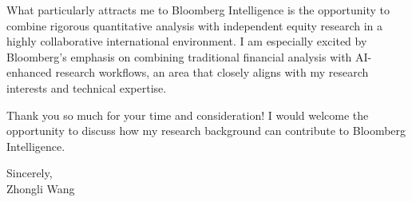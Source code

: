 \documentclass[11pt]{article}
\begin{document}
What particularly attracts me to Bloomberg Intelligence is the opportunity to combine rigorous quantitative analysis with independent equity research in a highly collaborative international environment. I am especially excited by Bloomberg's emphasis on combining traditional financial analysis with AI-enhanced research workflows, an area that closely aligns with my research interests and technical expertise.

Thank you so much for your time and consideration! I would welcome the opportunity to discuss how my research background can contribute to Bloomberg Intelligence. 

\vspace{0.15cm}
\noindent Sincerely, \\[0.2cm]
\noindent Zhongli Wang
\end{document}
